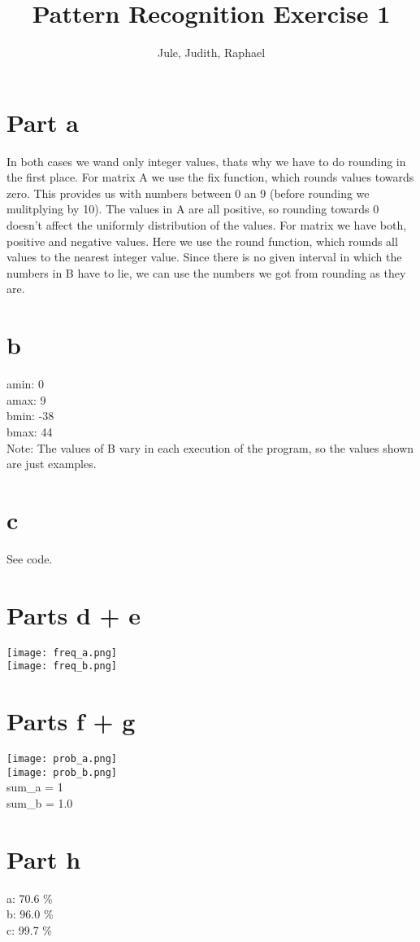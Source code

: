 \documentclass[11pt]{article}%
\begin{document}
\author{Jule, Judith, Raphael}
\title{\vspace{-1.5cm}Pattern Recognition Exercise 1}
\date{}
\maketitle
\section*{Part a}
In both cases we wand only integer values, thats why we have to do rounding in the first place. For matrix A we use the fix function, which rounds values towards zero. This provides us with numbers between 0 an 9 (before rounding we mulitplying by 10). The values in A are all positive, so rounding towards 0 doesn't affect the uniformly distribution of the values.
For matrix we have both, positive and negative values. Here we use the round function, which rounds all values to the nearest integer value. Since there is no given interval in which the numbers in B have to lie, we can use the numbers we got from rounding as they are.
\section*{b}
amin: 0\\
amax: 9\\
bmin: -38\\
bmax: 44\\
Note: The values of B vary in each execution of the program, so the values shown are just examples.
\section*{c}
See code.
\section*{Parts d + e}
\texttt{[image: freq\_a.png]}\\
\texttt{[image: freq\_b.png]}\\
\section*{Parts f + g}
\texttt{[image: prob\_a.png]}\\
\texttt{[image: prob\_b.png]}\\
sum\_a = 1\\
sum\_b = 1.0
\section*{Part h}
a: 70.6 \%\\
b: 96.0 \%\\
c: 99.7 \%\\

\newpage
\end{document}

